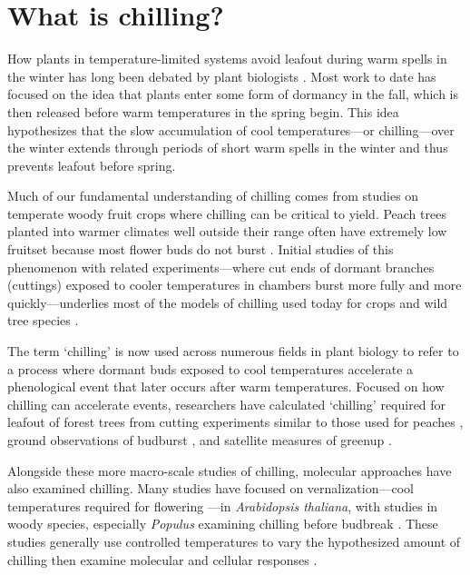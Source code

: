 \documentclass[11pt]{article}
\begin{document}
\section*{What is chilling?}

How plants in temperature-limited systems avoid leafout during warm spells in the winter has long been debated by plant biologists \citep[e.g.,][]{lamb1948effect,weinberger}. Most work to date has focused on the idea that plants enter some form of dormancy in the fall, which is then released before warm temperatures in the spring begin. This idea hypothesizes that the slow accumulation of cool temperatures---or chilling---over the winter extends through periods of short warm spells in the winter and thus prevents leafout before spring. 

Much of our fundamental understanding of chilling comes from studies on temperate woody fruit crops where chilling can be critical to yield. Peach trees planted into warmer climates well outside their range often have extremely low fruitset because most flower buds do not burst \citep{weinberger,overcash1955effects,erez1971improved}. Initial studies of this phenomenon with related experiments---where cut ends of dormant branches (cuttings) exposed to cooler temperatures in chambers burst more fully and more quickly---underlies most of the models of chilling used today for crops and wild tree species \citep[][]{weinberger,ospreebbms}. %

The term `chilling' is now used across numerous fields in plant biology to refer to a process where dormant buds exposed to cool temperatures accelerate a phenological event that later occurs after warm temperatures. Focused on how chilling can accelerate events, researchers have calculated `chilling' required for leafout of forest trees from cutting experiments similar to those used for peaches \citep[reviewed in][]{ospreebbms}, ground observations of budburst \citep{Luedeling2009}, and satellite measures of greenup \citep{kaduk2011predicting}.  %

Alongside these more macro-scale studies of chilling, molecular approaches have also examined chilling. Many studies have focused on vernalization---cool temperatures required for flowering \citep{kim2009vernalization}---in \emph{Arabidopsis thaliana}, with studies in woody species, especially \emph{Populus} examining chilling before budbreak \citep[][]{azeez2021early,cai2024molecular}. These studies generally use controlled temperatures to vary the hypothesized amount of chilling then examine molecular and cellular responses \citep[e.g.,][]{pan2021aba,azeez2021early,cai2024molecular}.
\end{document}
